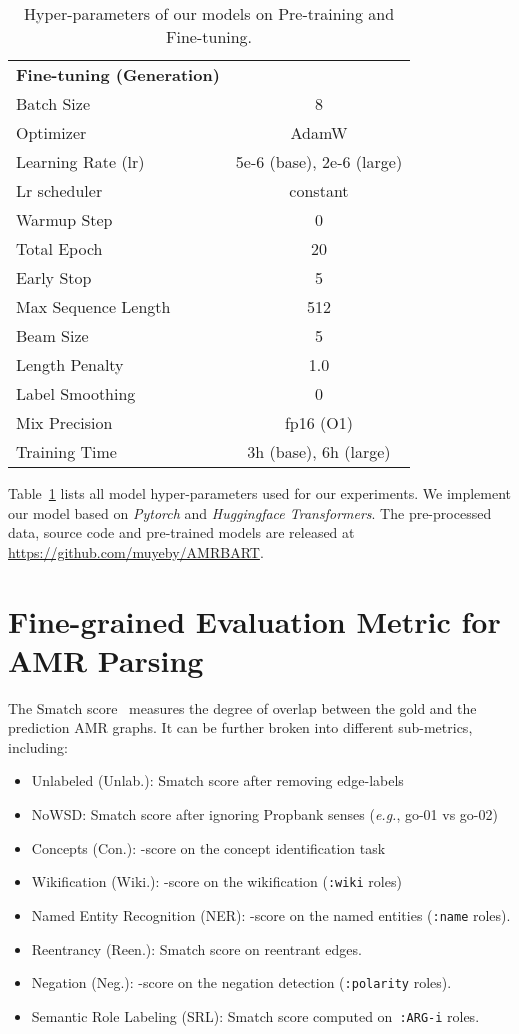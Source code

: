 \documentclass[11pt]{article}
\begin{document}
\begin{table}[!t]
\begin{tabular}{l|c}
        \midrule
        \textbf{Fine-tuning (Generation)} & \\
        Batch Size & 8 \\
        Optimizer & AdamW \\
        Learning Rate (lr) & 5e-6 (base), 2e-6 (large) \\
        Lr scheduler & constant  \\
        Warmup Step & 0 \\
        Total Epoch & 20 \\
        Early Stop & 5 \\
        Max Sequence Length & 512 \\
        Beam Size & 5 \\
        Length Penalty & 1.0 \\
        Label Smoothing & 0 \\
        Mix Precision & fp16 (O1) \\
        Training Time & 3h (base), 6h (large) \\
        \bottomrule
    \end{tabular}
    \caption{Hyper-parameters of our models on Pre-training and Fine-tuning.}
    \label{tab:params}
\end{table}

Table~\ref{tab:params} lists all model hyper-parameters used for our experiments.
We implement our model based on \textit{Pytorch} and \textit{Huggingface Transformers}.
The pre-processed data, source code and pre-trained models are released at \url{https://github.com/muyeby/AMRBART}.

\section{Fine-grained Evaluation Metric for AMR Parsing}\label{appendix:metrix}
The Smatch score~\cite{cai-knight-2013-smatch} measures the degree of overlap between the gold and the prediction AMR graphs. 
It can be further broken into different sub-metrics, including:
\begin{itemize}
    \item Unlabeled (Unlab.): Smatch score after removing edge-labels
    \item NoWSD: Smatch score after ignoring Propbank senses (\emph{e.g.}, go-01 vs go-02)
    \item Concepts (Con.): -score on the concept identification task
    \item Wikification (Wiki.): -score on the wikification (\texttt{:wiki} roles)
    \item Named Entity Recognition (NER): -score on the named entities (\texttt{:name} roles).
    \item Reentrancy (Reen.): Smatch score on reentrant edges.
    \item Negation (Neg.): -score on the negation detection (\texttt{:polarity} roles).
    \item Semantic Role Labeling (SRL): Smatch score computed on~\texttt{:ARG-i} roles.
\end{itemize}
\end{document}
